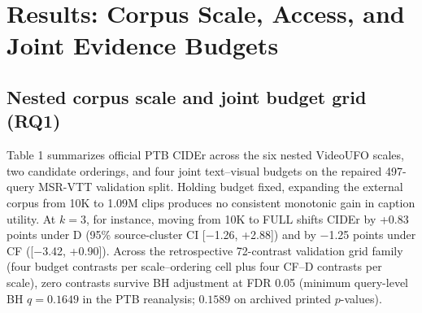 \documentclass[11pt,a4paper]{article}
\begin{document}
\section{Results: Corpus Scale, Access, and Joint Evidence Budgets}
\subsection{Nested corpus scale and joint budget grid (RQ1)}
Table 1 summarizes official PTB CIDEr across the six nested VideoUFO scales, two candidate orderings, and four joint text--visual budgets on the repaired 497-query MSR-VTT validation split. Holding budget fixed, expanding the external corpus from 10K to 1.09M clips produces no consistent monotonic gain in caption utility. At $k=3$, for instance, moving from 10K to FULL shifts CIDEr by +0.83 points under D (95\% source-cluster CI [$-$1.26, +2.88]) and by $-$1.25 points under CF ([$-$3.42, +0.90]). Across the retrospective 72-contrast validation grid family (four budget contrasts per scale--ordering cell plus four CF--D contrasts per scale), zero contrasts survive BH adjustment at FDR 0.05 (minimum query-level BH $q = 0.1649$ in the PTB reanalysis; $0.1589$ on archived printed $p$-values).

\begin{table}[t]
\centering
\footnotesize
\caption{Repaired MSR-VTT validation CIDEr (official PTB points; \emph{n} = 497, 361 sources) across six nested VideoUFO clip scales, two candidate orderings (CF raw similarity, D full-caption consensus), and four paired text--visual budgets.}
\label{tab:1}
\end{table}
\end{document}

